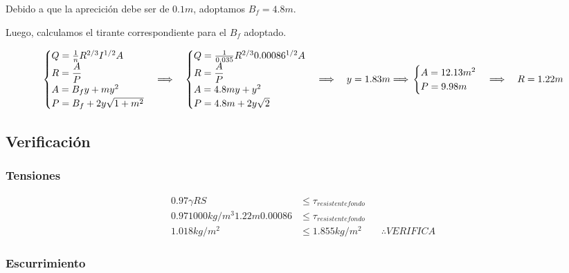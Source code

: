 \documentclass[10.5pt]{article}
\begin{document}
Debido a que la aprecición debe ser de $0.1 m$, adoptamos $B_{f} = 4.8 m$.

Luego, calculamos el tirante correspondiente para el $B_{f}$ adoptado.

\begin{equation*}
  \begin{cases}
    Q = \frac{1}{n} R^{2/3} I^{1/2} A \\
    R = \dfrac{A}{P} \\
    A = B_{f}y + m y^{2} \\
    P = B_{f} + 2 y \sqrt{1 + m^{2}}
  \end{cases}
  \Longrightarrow \quad
  \begin{cases}
    Q = \frac{1}{0.035} R^{2/3} 0.00086^{1/2} A \\
    R = \dfrac{A}{P} \\
    A = 4.8 m y + y^2 \\
    P = 4.8 m + 2 y \sqrt{2}
  \end{cases}
  \Longrightarrow \quad
  y = 1.83 m
  \Longrightarrow \newline
  \begin{cases}
    A = 12.13 m^2 \\
    P = 9.98 m
  \end{cases}
  \Longrightarrow \quad
  R = 1.22 m
\end{equation*}


\subsection*{Verificación}

\subsubsection*{Tensiones}

\begin{align*}
 0.97 \gamma R S &\leq \tau_{resistente fondo} \\
 0.97 1000 kg/m^3 1.22 m 0.00086 &\leq \tau_{resistente fondo} \\
 1.018 kg/m^2 &\leq 1.855 kg/m^2
 \qquad
 \therefore VERIFICA 
\end{align*}


\subsubsection*{Escurrimiento}
\end{document}
